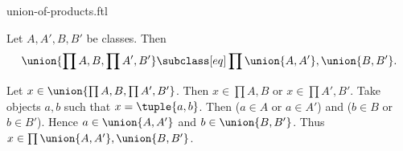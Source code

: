 \documentclass{article}
\begin{document}
\begin{smodule}[creators={Marcel Schütz}]{union-of-products.ftl}

  \begin{fproposition*}[label=8108691584712704]
    Let $A, A', B, B'$ be classes.
    Then \[\union{\prod{A,B},\prod{A',B'}} \subclass[eq] \prod{\union{A,A'},\union{B,B'}}.\]
  \end{fproposition*}
  \begin{fproof}
    Let $x \in \union{\prod{A,B},\prod{A',B'}}$.
    Then $x \in \prod{A,B}$ or $x \in \prod{A',B'}$.
    Take objects $a, b$ such that $x = \tuple{a,b}$.
    Then ($a \in A$ or $a \in A'$) and ($b \in B$ or $b \in B'$).
    Hence $a \in \union{A,A'}$ and $b \in \union{B,B'}$.
    Thus $x \in \prod{\union{A,A'},\union{B,B'}}$.
  \end{fproof}
\end{smodule}
\end{document}
